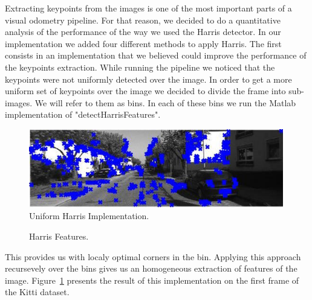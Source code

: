 Extracting keypoints from the images is one of the most important parts of a visual odometry pipeline. For that reason, we
decided to do a quantitative analysis of the performance of the way we used the Harris detector.
In our implementation we added four different methods to apply Harris.
The first consists in an implementation that we believed could improve the performance of the keypoints extraction.
While running the pipeline we noticed that the keypoints were not uniformly detected over the image.
In order to get a more uniform set of keypoints over the image we decided to divide the frame into sub-images. We will refer to them
as bins. In each of these bins we run the Matlab implementation of "detectHarrisFeatures".

\begin{figure}
  \includegraphics[width=0.99\textwidth]{files/custom_uniform_keypoints.jpg}
  \caption[\label{f:custom_uniform}Uniform Harris Implementation]{Uniform Harris Implementation.}
\end{figure}

\begin{figure}[b]
\caption[\label{f:harris}Harris Features]{Harris Features.}
\end{figure}

This provides us with localy optimal corners in
the bin. Applying this approach recursevely over the bins gives us an homogeneous extraction of features of the image. Figure~\ref{f:custom_uniform} 
presents the result of this implementation on the first frame of the Kitti dataset.

